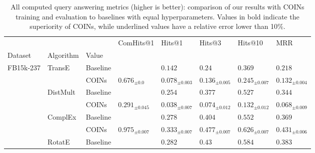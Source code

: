 \begin{table}[!ht]
  \caption[All computed query answering metrics.]{All computed query answering metrics (higher is better): comparison of our results with COINs training and evaluation to baselines with equal hyperparameters. Values in bold indicate the superiority of COINs, while underlined values have a relative error lower than 10\%.}
  \label{tab:performance_query_answering}
  \centering
  \begin{adjustbox}{width=\textwidth}   
\begin{tabular}{llllllll}
\toprule
         &           &       &                ComHits@1 &                             Hits@1 &                             Hits@3 &                            Hits@10 &                                MRR \\
Dataset & Algorithm & Value &                          &                                    &                                    &                                    &                                    \\
\midrule
FB15k-237 & TransE & Baseline &                          &                        ${{0.142}}$ &                         ${{0.24}}$ &                        ${{0.369}}$ &                        ${{0.218}}$ \\
         &           & COINs &    ${{0.676}_{\pm 0.0}}$ &            ${{0.078}_{\pm 0.003}}$ &            ${{0.136}_{\pm 0.005}}$ &            ${{0.245}_{\pm 0.007}}$ &            ${{0.132}_{\pm 0.004}}$ \\
         & DistMult & Baseline &                          &                        ${{0.254}}$ &                        ${{0.377}}$ &                        ${{0.527}}$ &                        ${{0.344}}$ \\
         &           & COINs &  ${{0.291}_{\pm 0.045}}$ &            ${{0.038}_{\pm 0.007}}$ &            ${{0.074}_{\pm 0.012}}$ &            ${{0.132}_{\pm 0.012}}$ &            ${{0.068}_{\pm 0.009}}$ \\
         & ComplEx & Baseline &                          &                        ${{0.278}}$ &                        ${{0.404}}$ &                        ${{0.552}}$ &                        ${{0.369}}$ \\
         &           & COINs &  ${{0.975}_{\pm 0.007}}$ &     $\mathbf{{0.333}_{\pm 0.007}}$ &     $\mathbf{{0.477}_{\pm 0.007}}$ &     $\mathbf{{0.626}_{\pm 0.007}}$ &     $\mathbf{{0.431}_{\pm 0.006}}$ \\
         & RotatE & Baseline &                          &                        ${{0.282}}$ &                         ${{0.43}}$ &                        ${{0.584}}$ &                        ${{0.383}}$ \\

\end{tabular}
\end{adjustbox}
\end{table}
